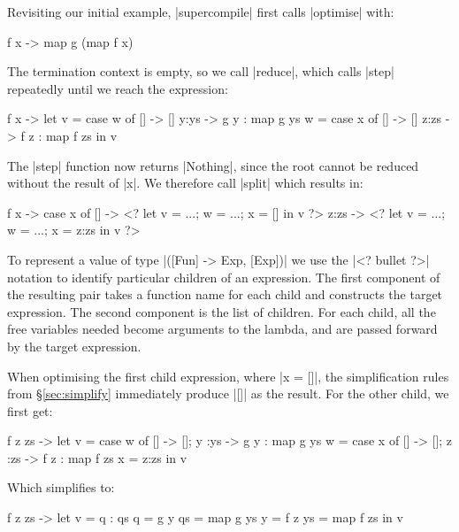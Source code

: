 \documentclass[draft]{sigplanconf}
\begin{document}
Revisiting our initial example, |supercompile| first calls |optimise| with:

\begin{code}
\g f x -> map g (map f x)
\end{code}

The termination context is empty, so we call |reduce|, which calls |step| repeatedly until we reach the expression:

\begin{code}
\g f x ->  let  v = case  w of
                          [] -> []
                          y:ys -> g y : map g ys
                w = case  x of
                          [] -> []
                          z:zs -> f z : map f zs
           in   v
\end{code}

The |step| function now returns |Nothing|, since the root cannot be reduced without the result of |x|. We therefore call |split| which results in:

\begin{code}
\g f x -> case  x of
                []    -> <? let v = ...; w = ...; x = [] in v ?>
                z:zs  -> <? let v = ...; w = ...; x = z:zs in v ?>
\end{code}

To represent a value of type |([Fun] -> Exp, [Exp])| we use the |<? bullet ?>| notation to identify particular children of an expression. The first component of the resulting pair takes a function name for each child and constructs the target expression. The second component is the list of children. For each child, all the free variables needed become arguments to the lambda, and are passed forward by the target expression.

When optimising the first child expression, where |x = []|, the simplification rules from \S\ref{sec:simplify} immediately produce |[]| as the result. For the other child, we first get:

\begin{code}
\g f z zs ->
    let  v = case  w  of [] -> []; y  :ys  -> g  y  : map g  ys
         w = case  x  of [] -> []; z  :zs  -> f  z  : map f  zs
         x = z:zs
    in   v
\end{code}

Which simplifies to:

\begin{code}
\g f z zs ->  let  v = q : qs
                   q = g y
                   qs = map g ys
                   y = f z
                   ys = map f zs
              in   v
\end{code}
\end{document}
